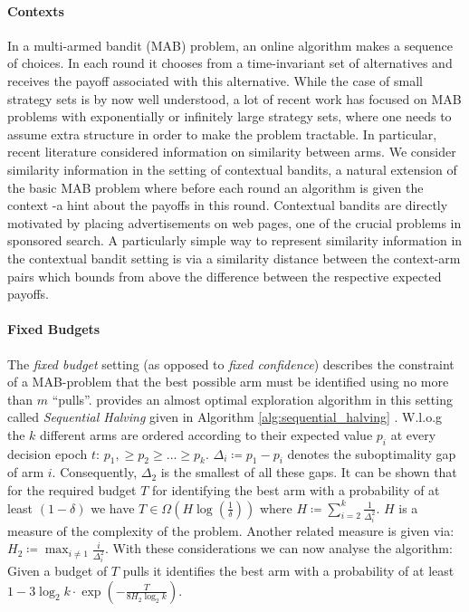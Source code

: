 \paragraph{Contexts} 
\cite{slivkins2014contextual}
In a multi-armed bandit (MAB) problem, an online algorithm makes a sequence of choices. In each round it chooses from a time-invariant set of alternatives and receives the payoff associated with this alternative. While the case of small strategy sets is by now well understood, a lot of recent work has focused on MAB problems with exponentially or infinitely large strategy sets, where one needs to assume extra structure in order to make the problem tractable. In particular, recent literature considered information on similarity between arms.
We consider similarity information in the setting of contextual bandits, a natural extension of the basic MAB problem where before each round an algorithm is given the context -a hint about the payoffs in this round. Contextual bandits are directly motivated by placing advertisements on web pages, one of the crucial problems in sponsored search. A particularly simple way to represent similarity information in the contextual bandit setting is via a similarity distance between the context-arm pairs which bounds from above the difference between the respective expected payoffs.
\paragraph{Fixed Budgets}
The \textit{fixed budget} setting (as opposed to \textit{fixed confidence}) describes the constraint of a MAB-problem that the best possible arm must be identified using no more than $m$ \enquote{pulls}.
\cite{karnin2013almost} provides an almost optimal exploration algorithm in this setting called \textit{Sequential Halving} given in Algorithm \ref{alg:sequential_halving} . W.l.o.g the $k$ different arms are ordered according to their expected value $p_i$ at every decision epoch $t$: $p_1, \geq p_2 \geq \ldots \geq p_k$. $\Delta_i \coloneqq p_1 - p_i$ denotes the suboptimality gap of arm $i$. Consequently, $\Delta_2$ is the smallest of all these gaps. It can be shown that for the required budget $T$ for identifying the best arm with a probability of at least $(1-\delta)$ we have $T \in \Omega(H \log (\frac{1}{\delta}))$ where $H \coloneqq \sum_{i=2}^{k} \frac{1}{\Delta_i^2}$. $H$ is a measure of the complexity of the problem. Another related measure is given via: $H_2 \coloneqq \max_{i \neq 1} \frac{i}{\Delta_i^2}$. With these considerations we can now analyse the algorithm: Given a budget of $T$ pulls it identifies the best arm with a probability of at least $1-3 \log_2 k \cdot \exp \left(-\frac{T}{8H_2 \log_2 k}\right)$. 

